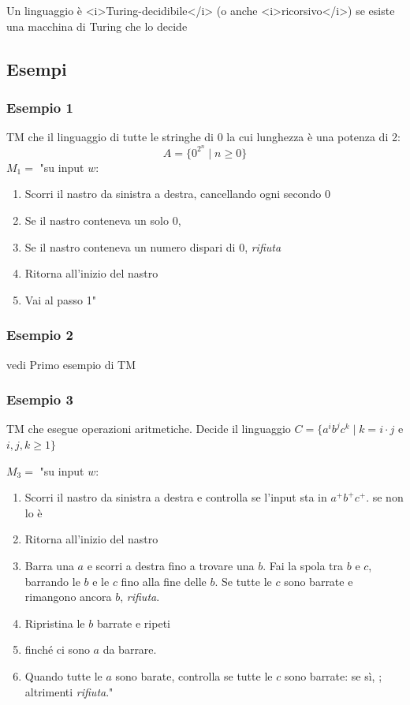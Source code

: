 \begin{theorem}
	Un linguaggio è <i>Turing-decidibile</i> (o anche <i>ricorsivo</i>) se esiste una macchina di Turing che lo decide
\end{theorem}

\subsection{Esempi}
\subsubsection{Esempio 1}
TM che  il linguaggio di tutte le stringhe di $0$ la cui lunghezza è una potenza di 2:
$$A = \{0^{2^n}\mid n\geq 0\}$$
$M_1=$ "su input $w$: 
\begin{enumerate}
	\item Scorri il nastro da sinistra a destra, cancellando ogni secondo $0$ 
	\item Se il nastro conteneva un solo $0$, 
	\item Se il nastro conteneva un numero dispari di $0$, \textit{rifiuta}
	\item  Ritorna all'inizio del nastro
	\item  Vai al passo 1"
\end{enumerate}

\subsubsection{Esempio 2}
vedi Primo esempio di TM

\subsubsection{Esempio 3}
TM che esegue operazioni aritmetiche.  Decide il linguaggio
$C=\{a^ib^jc^k\mid k = i\cdot j$ e $i,j,k\geq 1\}$ 

$M_3=$ "su input $w$:
\begin{enumerate}
	\item Scorri il nastro da sinistra a destra e controlla se l'input sta in $a^+b^+c^+$.  se non lo è
	\item Ritorna all'inizio del nastro
	\item Barra una $a$ e scorri a destra fino a trovare una $b$. Fai la spola tra $b$ e $c$, barrando le $b$ e le $c$ fino alla fine delle $b$. Se tutte le $c$ sono barrate e rimangono ancora $b$, \textit{rifiuta}.
	\item Ripristina le $b$ barrate e ripeti \item finché ci sono $a$ da barrare.
	\item Quando tutte le $a$ sono barate, controlla se tutte le $c$ sono barrate: se sì, ; altrimenti \textit{rifiuta}."
\end{enumerate}

